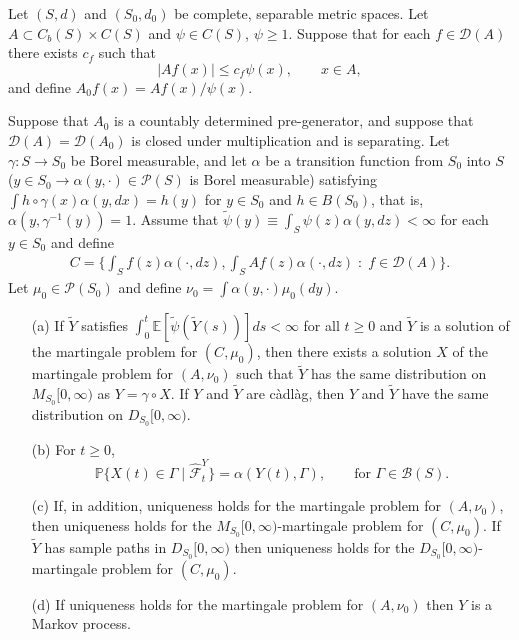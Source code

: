 \documentclass[EJP]{ejpecp} %
\renewcommand{\hat}{\widehat}
\renewcommand{\tilde}{\widetilde}
\newcommand{\IP}{\mathbb P}
\newcommand{\IE}{\mathbb E}
\begin{document}
\begin{theorem} \label{thm:mmt}
    Let $(S,d)$ and $(S_0,d_0)$ be complete, separable metric spaces.
    Let $A \subset C_b(S) \times C(S)$ and $\psi \in C(S)$, $\psi \ge 1$.
    Suppose that for each $f \in \mathcal{D}(A)$ there exists $c_f$
    such that
    $$ |Af(x)| \le c_f \psi(x), \qquad x \in A, $$
    and define $A_0 f(x) = Af(x) / \psi(x)$.

    Suppose that $A_0$ is a countably determined pre-generator,
    and suppose that $\mathcal{D}(A) = \mathcal{D}(A_0)$
    is closed under multiplication and is separating.
    Let $\gamma : S \to S_0$ be Borel measurable,
    and let $\alpha$ be a transition function from $S_0$ into $S$
    ($y \in S_0 \to \alpha(y,\cdot)\in\mathcal{P}(S)$ is Borel measurable)
    satisfying $\int h\circ\gamma(x)\alpha(y,dx) = h(y)$ for $y \in S_0$ and $h \in B(S_0)$,
    that is, $\alpha(y,\gamma^{-1}(y)) = 1$.
    Assume that $\tilde \psi(y) \equiv \int_S \psi(z) \alpha(y,dz) < \infty$ for each $y \in S_0$
    and define
    \begin{align} \label{eqn:C_defn}
        C = \{
        \int_S f(z) \alpha(\cdot,dz),
        \int_S Af(z) \alpha(\cdot,dz)
        \; : \; f \in \mathcal{D}(A)
    \} . \end{align}
    Let $\mu_0 \in \mathcal{P}(S_0)$ and define $\nu_0 = \int \alpha(y,\cdot) \mu_0(dy)$.
    \begin{itemize}
        \item[(a)]
            If $\tilde Y$ satisfies $\int_0^t \IE[\tilde \psi(\tilde Y(s))]ds < \infty$
            for all $t \ge 0$ and $\tilde Y$ is a solution of the martingale problem for $(C,\mu_0)$,
            then there exists a solution $X$ of the martingale problem for $(A,\nu_0)$
            such that $\tilde Y$ has the same distribution on $M_{S_0}[0,\infty)$
            as $Y = \gamma \circ X$.
            If $Y$ and $\tilde Y$ are c\`adl\`ag, then $Y$ and $\tilde Y$ have the same distribution
            on $D_{S_0}[0,\infty)$.
        \item[(b)]
            For $t \ge 0$,
            $$ \IP\{ X(t) \in \Gamma \;|\; \hat{\mathcal{F}}^Y_t \}
            = \alpha(Y(t),\Gamma), \qquad \text{for } \Gamma \in \mathcal{B}(S).
            $$
        \item[(c)]
            If, in addition, uniqueness holds for the martingale problem for $(A,\nu_0)$,
            then uniqueness holds for the $M_{S_0}[0,\infty)$-martingale problem for $(C,\mu_0)$.
            If $\tilde Y$ has sample paths in $D_{S_0}[0,\infty)$ then uniqueness holds for the
            $D_{S_0}[0,\infty)$-martingale problem for $(C,\mu_0)$.
        \item[(d)]
            If uniqueness holds for the martingale problem for $(A,\nu_0)$
            then $Y$ is a Markov process.
    \end{itemize}
\end{theorem}
\end{document}

